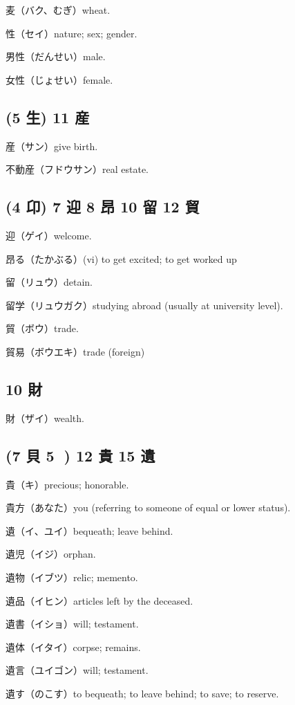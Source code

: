 麦（バク、むぎ）wheat.

性（セイ）nature; sex; gender.

男性（だんせい）male.

女性（じょせい）female.

\subsection{(5 生) 11 産}

産（サン）give birth.

不動産（フドウサン）real estate.

\subsection{(4 卬) 7 迎 8 昂 10 留 12 貿}

迎（ゲイ）welcome.

昂る（たかぶる）(vi) to get excited; to get worked up

留（リュウ）detain.

留学（リュウガク）studying abroad (usually at university level).

貿（ボウ）trade.

貿易（ボウエキ）trade (foreign)

\subsection{10 財}

財（ザイ）wealth.

\subsection{(7 貝 5 𠀐) 12 貴 15 遺}

貴（キ）precious; honorable.

貴方（あなた）you (referring to someone of equal or lower status).

遺（イ、ユイ）bequeath; leave behind.

遺児（イジ）orphan.

遺物（イブツ）relic; memento.

遺品（イヒン）articles left by the deceased.

遺書（イショ）will; testament.

遺体（イタイ）corpse; remains.

遺言（ユイゴン）will; testament.

遺す（のこす）to bequeath; to leave behind; to save; to reserve.

